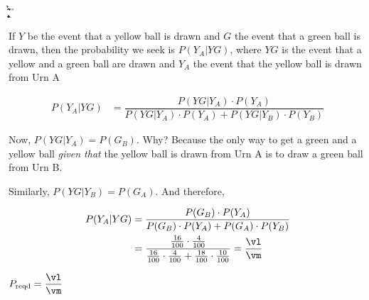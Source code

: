 \FRACTIONSIMPLIFY{}\a\b %
\FRACTIONSIMPLIFY{}\c\d %
\FRACTIONSIMPLIFY{}\e\f %
\FRACTIONSIMPLIFY{}\g\h %
\FRACMULT\c\d\e\f\p\q
\FRACMULT\a\b\g\h\r\s
\FRACDIV\r\s\p\q\m\n
\FRACADD\m{}\vj\vk
{}\vj\vk\vl\vm

\begin{solution}[\fullpage]
   If $Y$ be the event that a yellow ball is drawn and $G$ the event that a green ball is 
   drawn, then the probability we seek is $P(Y_A \vert YG)$, where $YG$ is the event
   that a yellow and a green ball are drawn and $Y_A$ the event that the yellow ball is 
   drawn from Urn A
   
   \begin{align}
      P(Y_A \vert YG) &= \dfrac{P(YG \vert Y_A)\cdot P(Y_A)}{P(YG \vert Y_A)\cdot P(Y_A) + P(YG \vert Y_B)\cdot P(Y_B)}
   \end{align}
   
   Now, $P(YG \vert Y_A) = P(G_B)$. Why? Because the only way to get a green and a yellow ball 
   \textit{given that} the yellow ball is drawn from Urn A is to draw a green ball from Urn B.
   
   Similarly, $P(YG \vert Y_B) = P(G_A)$. And therefore, 
   
   \begin{align}
       P(Y_A \vert YG) &= \dfrac{P(G_B)\cdot P(Y_A)}{P(G_B)\cdot P(Y_A) + P(G_A)\cdot P(Y_B)} \\
                       &= \dfrac{\frac\vx{100}\cdot\frac\vb{100}}{\frac\vx{100}\cdot\frac\vb{100}+\frac\vd{100}\cdot\frac\vv{100}} 
                       = \dfrac\vl\vm 
   \end{align}
\end{solution}

\ifprintanswers
  \begin{codex}
    $P_{\text{reqd}} = \dfrac\vl\vm$
  \end{codex}
\fi
